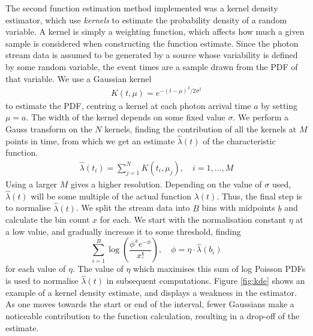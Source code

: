 \documentclass[a4paper,11pt]{article}
\begin{document}
   The second function estimation method implemented was a kernel density
   estimator, which use \emph{kernels} to estimate the probability density of a
   random variable. A kernel is simply a weighting function, which affects how
   much a given sample is considered when constructing the function
   estimate. Since the photon stream data is assumed to be generated by a source
   whose variability is defined by some random variable, the event times are a
   sample drawn from the PDF of that variable. We use a Gaussian kernel
   \begin{align}
   K(t,\mu)=e^{-(t-\mu)^2/2\sigma^2}
   \end{align}
   to estimate the PDF, centring a kernel at each photon arrival time $a$ by
   setting $\mu=a$. The width of the kernel depends on some fixed value
   $\sigma$. We perform a Gauss transform on the $N$ kernels, finding the
   contribution of all the kernels at $M$ points in time, from which we get an
   estimate $\hat{\lambda}(t)$ of the characteristic function.
   \begin{align}
   \hat{\lambda}(t_i) = \sum_{j=1}^N K(t_i,\mu_j), \quad i=1,\dots,M
   \end{align}
   Using a larger $M$ gives a higher resolution. Depending on the value of
   $\sigma$ used, $\hat{\lambda}(t)$ will be some multiple of the actual
   function $\lambda(t)$. Thus, the final step is to normalise
   $\hat{\lambda}(t)$. We split the stream data into $B$ bins with midpoints $b$
   and calculate the bin count $x$ for each. We start with the normalisation
   constant $\eta$ at a low value, and gradually increase it to some threshold,
   finding
   \begin{equation}\label{eq:normcalc}
   \sum_{i=1}^B
   \log\left(\frac{\phi^xe^{-\phi}}{x!}\right), \quad \phi=\eta\cdot\hat{\lambda}(b_i)
   \end{equation}
   for each value of $\eta$. The value of $\eta$ which maximises this sum of log
   Poisson PDFs is used to normalise $\hat{\lambda}(t)$ in subsequent
   computations. Figure \ref{fig:kde} shows an example of a kernel density
   estimate, and displays a weakness in the estimator. As one moves towards the
   start or end of the interval, fewer Gaussians make a noticeable contribution
   to the function calculation, resulting in a drop-off of the estimate.
\end{document}
